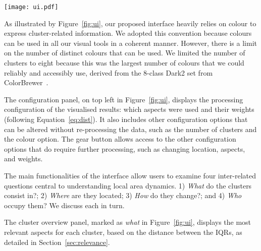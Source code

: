 \begin{figure*}
    \centering 
    \texttt{[image: ui.pdf]}
    \caption{Initial interface of our method showing the demographic evolution of Chicago and identifying the objectives of each plot.
        \textbf{(what)}: Cluster overview illustrating the most relevant aspect for each cluster. 
        \textbf{(where)}: Maps illustrating the geographical location, both as an overall summary and for each year.
        \textbf{(how)}: Tabular and visual summmarisation of how the regions classification changed over time.
        \textbf{(who)}: Demographic details for the currently selected data.
        \label{fig:ui}}
\end{figure*}


As illustrated by Figure~\ref{fig:ui}, our proposed
interface heavily relies on colour to express cluster-related information. We
adopted this convention because colours can be used in all our visual tools in a
coherent manner. However, there is a limit on the number of distinct colours
that can be used. We limited the number of clusters to eight because this was
the largest number of colours that we could reliably and accessibly use, derived
from the 8-class Dark2 set from ColorBrewer~\citep{ColorBrewer}. 


The configuration panel, on top left in Figure~\ref{fig:ui}, displays the
processing configuration of the visualised results: which aspects were used and
their weights (following Equation~\ref{eq:dist}). It also includes other
configuration options that can be altered without re-processing the data, such
as the number of clusters and the colour option. The gear button allows access
to the other configuration options that do require further processing, such as
changing location, aspects, and weights. 

The main functionalities of the interface allow users to examine four
inter-related questions central to understanding local area dynamics. 1)
\emph{What} do the clusters consist in?; 2) \emph{Where} are they located; 3)
\emph{How} do they change?; and 4) \emph{Who} occupy them? We discuss each in
turn.  

The cluster overview panel, marked as \emph{what} in Figure~\ref{fig:ui},
displays the most relevant aspects for each cluster, based on the distance
between the IQRs, as detailed in Section~\ref{sec:relevance}.


